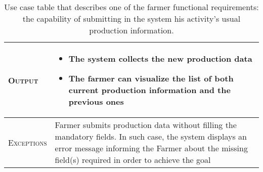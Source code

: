 \begin{table}[H]
\begin{tabular}[c]{|l|p{}|}
    	\hline %
    	\textsc{Output}             &  \begin{itemize}
    	    \item The system collects the new production data
    	    \item The farmer can visualize the list of both current production information and the previous ones
    	\end{itemize}\\
    	\hline %
    	\textsc{Exceptions}         &  Farmer submits production data without filling the mandatory fields. In such case, the system displays an error message informing the Farmer about the missing field(s) required in order to achieve the goal\\
    	\hline %
        
    \end{tabular}
    \caption{\label{tab:Production_data_submission}Use case table that describes one of the farmer functional requirements: the capability of submitting in the system his activity's usual production information.}
\end{table}


